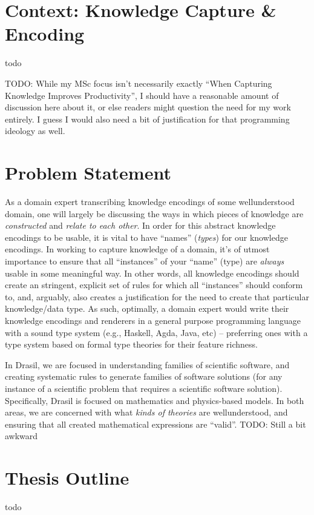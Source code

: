 \section{Context: Knowledge Capture \& Encoding}
todo

TODO: While my MSc focus isn't necessarily exactly ``When Capturing Knowledge Improves Productivity'', I should have a reasonable amount of discussion here about it, or else readers might question the need for my work entirely. I guess I would also need a bit of justification for that programming ideology as well.

\section{Problem Statement}
As a domain expert transcribing knowledge encodings of some well\-understood domain, one will largely be discussing the ways in which pieces of knowledge are \textit{constructed} and \textit{relate to each other}.
In order for this abstract knowledge encodings to be usable, it is vital to have ``names'' (\textit{types}) for our knowledge encodings.
In working to capture knowledge of a domain, it's of utmost importance to ensure that all ``instances'' of your ``name'' (type) are \textit{always} usable in some meaningful way.
In other words, all knowledge encodings should create an stringent, explicit set of rules for which all ``instances'' should conform to, and, arguably, also creates a justification for the need to create that particular knowledge/data type. 
As such, optimally, a domain expert would write their knowledge encodings and renderers in a general purpose programming language with a sound type system (e.g., Haskell, Agda, Java, etc) -- preferring ones with a type system based on formal type theories for their feature richness.

In Drasil, we are focused in understanding families of scientific software, and creating systematic rules to generate families of software solutions (for any instance of a scientific problem that requires a scientific software solution).
Specifically, Drasil is focused on mathematics and physics-based models.
In both areas, we are concerned with what \textit{kinds of theories} are well\-understood, and ensuring that all created mathematical expressions are ``valid''. TODO: Still a bit awkward

\section{Thesis Outline}
todo

